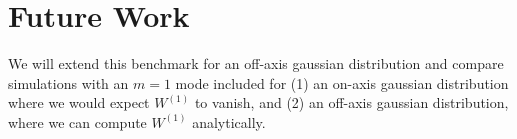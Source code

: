 \documentclass[]{tufte-handout}
\begin{document}
\section{Future Work}

We will extend this benchmark for an off-axis gaussian distribution and compare simulations with an $m=1$ mode included for (1) an on-axis gaussian distribution where we would expect $W^{(1)}$ to vanish, and (2) an off-axis gaussian distribution, where we can compute $W^{(1)}$ analytically.


\end{document}
